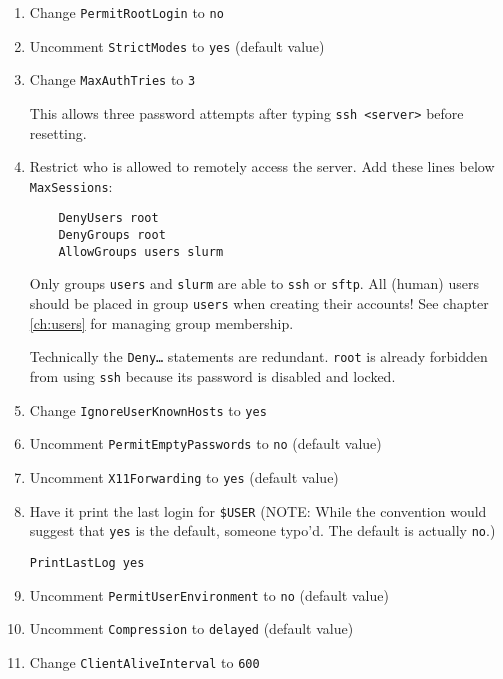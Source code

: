 \begin{enumerate}
\begin{enumerate}
	\item Change \texttt{PermitRootLogin} to \texttt{no}

	\item Uncomment \texttt{StrictModes} to \texttt{yes} (default value)

	\item Change \texttt{MaxAuthTries} to \texttt{3}

	This allows three password attempts after typing \texttt{ssh <server>} before resetting.

	\item Restrict who is allowed to remotely access the server. Add these lines below \texttt{MaxSessions}:
	\begin{verbatim}
	DenyUsers root
	DenyGroups root
	AllowGroups users slurm 
	\end{verbatim}

	Only groups \texttt{users} and \texttt{slurm} are able to \texttt{ssh} or \texttt{sftp}. All (human) users should be placed in group \texttt{users} when creating their accounts! See chapter \ref{ch:users} for managing group membership.

	Technically the \texttt{Deny\dots} statements are redundant. \texttt{root} is already forbidden from using \texttt{ssh} because its password is disabled and locked.

	\item Change \texttt{IgnoreUserKnownHosts} to \texttt{yes}

	\item Uncomment \texttt{PermitEmptyPasswords} to \texttt{no} (default value)

	\item Uncomment \texttt{X11Forwarding} to \texttt{yes} (default value)

	\item Have it print the last login for \texttt{\$USER} (NOTE: While the convention would suggest that \texttt{yes} is the default, someone typo'd. The default is actually \texttt{no}.)

		\texttt{PrintLastLog yes}

	\item Uncomment \texttt{PermitUserEnvironment} to \texttt{no} (default value)

	\item Uncomment \texttt{Compression} to \texttt{delayed} (default value)

	\item Change \texttt{ClientAliveInterval} to \texttt{600}


\end{enumerate}
\end{enumerate}
